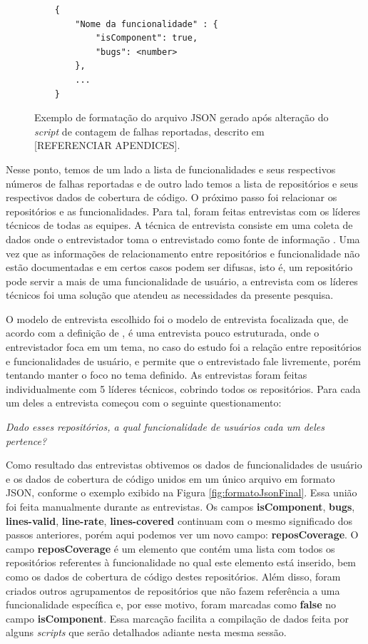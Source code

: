 \documentclass[11.5pt]{article}
\begin{document}
\begin{figure}[ht]
\caption{Exemplo de formatação do arquivo JSON gerado após alteração do \textit{script} de contagem
de falhas reportadas, descrito em [REFERENCIAR APENDICES].}
\label{fig:formatoJsonBugs}
\small
\begin{verbatim}
    {
        "Nome da funcionalidade" : {
            "isComponent": true,
            "bugs": <number>
        },
        ...
    }
\end{verbatim}
\end{figure}

Nesse ponto, temos de um lado a lista de funcionalidades e seus respectivos números de falhas
reportadas e de outro lado temos a lista de repositórios e seus respectivos dados de cobertura
de código.
O próximo passo foi relacionar os repositórios e as funcionalidades.
Para tal, foram feitas entrevistas com os líderes técnicos de todas as equipes.
A técnica de entrevista consiste em uma coleta de dados onde o entrevistador toma o entrevistado
como fonte de informação \cite{metodosPesquisaSocial}.
Uma vez que as informações de relacionamento entre repositórios e funcionalidade não estão
documentadas e em certos casos podem ser difusas, isto é, um repositório pode servir a mais de uma
funcionalidade de usuário, a entrevista com os líderes técnicos foi uma solução que atendeu as
necessidades da presente pesquisa.

O modelo de entrevista escolhido foi o modelo de entrevista focalizada que, de acordo com a
definição de \cite{metodosPesquisaSocial}, é uma entrevista pouco estruturada, onde o entrevistador
foca em um tema, no caso do estudo foi a relação entre repositórios e funcionalidades de usuário,
e permite que o entrevistado fale livremente, porém tentando manter o foco no tema definido.
As entrevistas foram feitas individualmente com 5 líderes técnicos, cobrindo todos os repositórios.
Para cada um deles a entrevista começou com o seguinte questionamento:

\begin{center}
\textit{Dado esses repositórios, a qual funcionalidade de usuários cada um deles pertence?}
\end{center}

Como resultado das entrevistas obtivemos os dados de funcionalidades de usuário e os dados de
cobertura de código unidos em um único arquivo em formato JSON, conforme o exemplo exibido na
Figura \ref{fig:formatoJsonFinal}.
Essa união foi feita manualmente durante as entrevistas.
Os campos \textbf{isComponent}, \textbf{bugs}, \textbf{lines-valid}, \textbf{line-rate},
\textbf{lines-covered} continuam com o mesmo significado dos passos anteriores, porém aqui podemos
ver um novo campo: \textbf{reposCoverage}.
O campo \textbf{reposCoverage} é um elemento que contém uma lista com todos os repositórios
referentes à funcionalidade no qual este elemento está inserido, bem como os dados de cobertura de
código destes repositórios.
Além disso, foram criados outros agrupamentos de repositórios que não fazem referência a uma
funcionalidade específica e, por esse motivo, foram marcadas como \textbf{false} no campo
\textbf{isComponent}.
Essa marcação facilita a compilação de dados feita por alguns \textit{scripts} que serão detalhados
adiante nesta mesma sessão.
\end{document}
